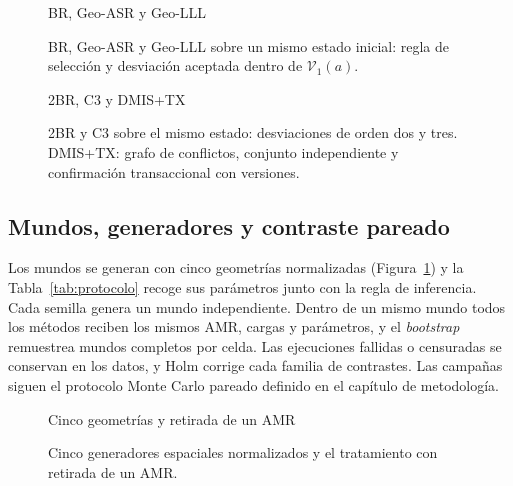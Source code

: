 \begin{figure}[H]\centering
{}
{BR, Geo-ASR y Geo-LLL}
\caption{BR, Geo-ASR y Geo-LLL sobre un mismo estado inicial: regla de selección y
desviación aceptada dentro de $\mathcal V_1(a)$.}
\end{figure}

\begin{figure}[H]\centering
{}
{2BR, C3 y DMIS+TX}
\caption{2BR y C3 sobre el mismo estado: desviaciones de orden dos y tres. DMIS+TX:
grafo de conflictos, conjunto independiente y confirmación transaccional con
versiones.}
\end{figure}


\subsection{Mundos, generadores y contraste pareado}

Los mundos se generan con cinco geometrías normalizadas
(Figura~\ref{fig:geometrias}) y la Tabla~\ref{tab:protocolo} recoge sus
parámetros junto con la regla de inferencia. Cada semilla genera un mundo
independiente. Dentro de un mismo mundo todos los
métodos reciben los mismos AMR, cargas y parámetros, y el \emph{bootstrap}
remuestrea mundos completos por celda. Las ejecuciones fallidas o censuradas se
conservan en los datos, y Holm corrige cada familia de contrastes. Las campañas
siguen el protocolo Monte Carlo pareado definido en el capítulo de metodología.

\begin{figure}[H]\centering
{}
{Cinco geometrías y retirada de un AMR}
\caption{Cinco generadores espaciales normalizados y el tratamiento con retirada
de un AMR.}
\label{fig:geometrias}
\viuownsource
\end{figure}

